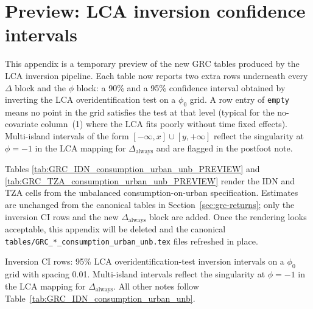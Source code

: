 \section{Preview: LCA inversion confidence intervals}\label{app:inversion-preview}

This appendix is a temporary preview of the new GRC tables produced by the LCA inversion pipeline.
Each table now reports two extra rows underneath every $\Delta$ block and the $\phi$ block: a 90\% and a 95\% confidence interval obtained by inverting the LCA overidentification test on a $\phi_0$ grid.
A row entry of \texttt{empty} means no point in the grid satisfies the test at that level (typical for the no-covariate column~(1) where the LCA fits poorly without time fixed effects).
Multi-island intervals of the form $[-\infty, x] \cup [y, +\infty]$ reflect the singularity at $\phi = -1$ in the LCA mapping for $\Delta_{\text{always}}$ and are flagged in the postfoot note.

Tables \ref{tab:GRC_IDN_consumption_urban_unb_PREVIEW} and \ref{tab:GRC_TZA_consumption_urban_unb_PREVIEW} render the IDN and TZA cells from the unbalanced consumption-on-urban specification.
Estimates are unchanged from the canonical tables in Section~\ref{sec:grc-returns}; only the inversion CI rows and the new $\Delta_{\text{always}}$ block are added.
Once the rendering looks acceptable, this appendix will be deleted and the canonical \texttt{tables/GRC\_*\_consumption\_urban\_unb.tex} files refreshed in place.



\begin{landscape}
\begin{table}[htbp]\centering
\caption{Preview---restricted GRC estimates of the returns to urban location on log consumption per capita, Indonesia (unbalanced)}
\label{tab:GRC_IDN_consumption_urban_unb_PREVIEW}
\begin{threeparttable}

\begin{tablenotes}[flushleft]\footnotesize
\item Inversion CI rows: 95\% LCA overidentification-test inversion intervals on a $\phi_0$ grid with spacing 0.01.
Multi-island intervals reflect the singularity at $\phi=-1$ in the LCA mapping for $\Delta_{\text{always}}$.
All other notes follow Table~\ref{tab:GRC_IDN_consumption_urban_unb}.
\end{tablenotes}
\end{threeparttable}
\end{table}
\end{landscape}

